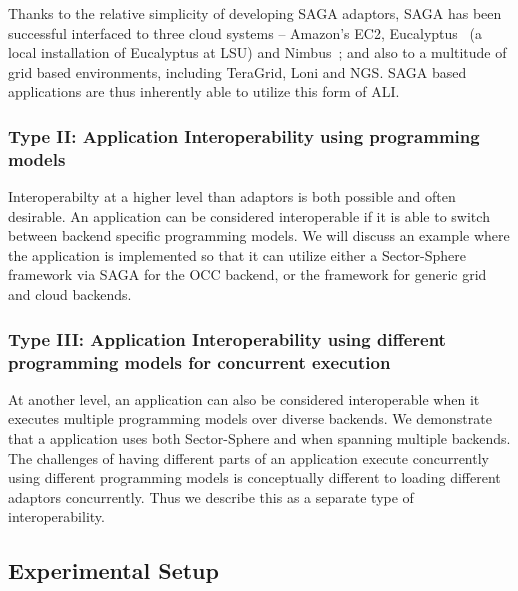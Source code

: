 \documentclass[3p,twocolumn]{elsarticle}
\begin{document}

Thanks to the relative simplicity of developing SAGA adaptors, SAGA
has been successful interfaced to three cloud systems -- Amazon's EC2,
Eucalyptus~\cite{eucalyptus} (a local installation of Eucalyptus at
LSU) and Nimbus~\cite{nimbus}; and also to a multitude of grid based
environments, including TeraGrid, Loni and NGS.  SAGA based
applications are thus inherently able to utilize this form of ALI.

\subsubsection{Type II: Application Interoperability using programming
  models} %
%
%

Interoperabilty at a higher level than adaptors is both possible and
often desirable. An application can be considered interoperable if it
is able to switch between backend specific programming models.  We
will discuss an example where the \wc application is implemented so
that it can utilize either a Sector-Sphere framework via SAGA for the
OCC backend, or the \smr framework for generic grid and cloud
backends.

\subsubsection{Type III: Application Interoperability using different
  programming models for concurrent execution}
%
%

At another level, an application can also be considered interoperable
when it executes multiple programming models  over
diverse backends.  We demonstrate that a \wc application uses both
Sector-Sphere and \smr when spanning  multiple backends.  The
challenges of having different parts of an application execute
concurrently using different programming models is conceptually
different to loading different adaptors concurrently. Thus we describe
this as a separate type of interoperability.

\subsection{Experimental Setup}
\end{document}

